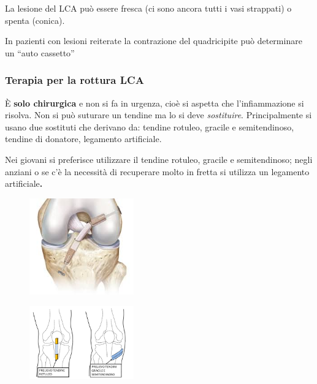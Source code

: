 La lesione del LCA può essere fresca (ci sono ancora tutti i vasi strappati) o spenta (conica).

In pazienti con lesioni reiterate la contrazione del quadricipite può determinare un ``auto cassetto''

\subsubsection{Terapia per la rottura LCA}

È \textbf{solo chirurgica} e non si fa in urgenza, cioè si aspetta che l'infiammazione si risolva. Non si può suturare un tendine ma lo si deve \emph{sostituire}. Principalmente si usano due sostituti che derivano da: tendine rotuleo, gracile e semitendinoso, tendine di donatore, legamento artificiale.

Nei giovani si preferisce utilizzare il tendine rotuleo, gracile e semitendinoso; negli anziani o se c'è la necessità di recuperare molto in fretta si utilizza un legamento artificiale\textbf{. }

\begin{figure}[!ht]
\centering
\includegraphics[width=0.4\textwidth]{009/image16.jpeg}
\end{figure}

\begin{figure}[!ht]
\centering
\includegraphics[width=0.4\textwidth]{009/image17.jpeg}
\end{figure}

